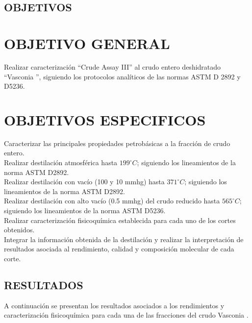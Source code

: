 \documentclass[12pt]{article}
\newcommand{\Sample}{Vasconia }
\begin{document}
\newpage
\begin{center}
\section*{OBJETIVOS}
\end{center}
\section*{OBJETIVO GENERAL}
\vspace{20 pt}
Realizar caracterización “Crude Assay III” al crudo entero deshidratado
“\Sample”, siguiendo los protocolos analíticos de las normas
ASTM D 2892 y D5236.
\section*{OBJETIVOS ESPECIFICOS}

Caracterizar las principales propiedades petrobásicas a la fracción de crudo
entero.\\

Realizar destilación atmosférica hasta $199^{\circ}C $; siguiendo los lineamientos de la
norma ASTM D2892.\\

Realizar destilación con vacío (100 y 10 mmhg) hasta $371^{\circ}C $; siguiendo los
lineamientos de la norma ASTM D2892.\\

Realizar destilación con alto vacío (0.5 mmhg) del crudo reducido hasta  $565^{\circ}C $;
siguiendo los lineamientos de la norma ASTM D5236.\\

Realizar caracterización fisicoquímica establecida para cada uno de los cortes
obtenidos.\\

Integrar la información obtenida de la destilación y realizar la interpretación de
resultados asociada al rendimiento, calidad y composición molecular de cada
corte.
\newpage

\begin{center}
\section*{RESULTADOS }
\end{center}


\vspace{20 pt}
A continuación se presentan los resultados asociados a los rendimientos y
caracterización fisicoquímica para cada una de las fracciones del crudo
\Sample. \\
\end{document}

